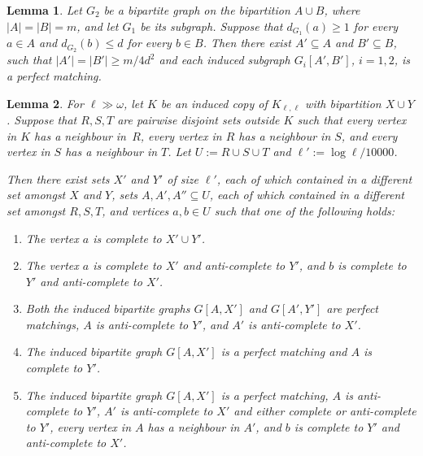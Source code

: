 \documentclass[10pt,a4paper]{amsart}
\theoremstyle{plain}
\newtheorem{lem}{Lemma}
\theoremstyle{definition}
\begin{document}
    \begin{lem} \label{obs:induced-matching}
        Let $G_2$ be a bipartite graph on the bipartition $A\cup B$, where $|A| = |B| = m$, and let $G_1$ be its subgraph. Suppose that $d_{G_1}(a) \ge 1$ for every $a \in A$ and $d_{G_2}(b) \le d$ for every $b \in B$.
        Then there exist $A' \subseteq A$ and $B' \subseteq B$, such that $|A'| = |B'| \ge m/4d^2$ and each induced subgraph $G_i[A', B']$, $i=1,2$, is a perfect matching. 
    \end{lem}%

    \begin{lem}\label{lem:cases}
        For $\ell \gg \omega$, let $K$ be an induced copy of $K_{\ell,\ell}$ with bipartition $X\cup Y$.
        Suppose that $R, S, T$ are pairwise disjoint sets outside $K$ such that every vertex in $K$ has a neighbour in~$R$, every vertex in $R$ has a neighbour in $S$, and every vertex in $S$ has a neighbour in $T$. 
        Let $U:=R\cup S\cup T$ and $\ell' := \log \ell / 10000$.
        
        
        Then there exist sets $X'$ and $Y'$ of size $\ell'$, each of which contained in a different set amongst $X$ and $Y$, sets $A, A', A'' \subseteq U$, each of which contained in a different set amongst $R, S, T$, and vertices $a, b \in U$ such that one of the following holds:
        \begin{enumerate} [label = (K\arabic*)]
            \item \label{itm:a}
                The vertex $a$ is complete to $X' \cup Y'$.
            \item \label{itm:b}
                The vertex $a$ is complete to $X'$ and anti-complete to $Y'$, and $b$ is complete to $Y'$ and anti-complete to $X'$. 
            \item \label{itm:c}
                Both the induced bipartite graphs $G[A, X']$ and $G[A', Y']$ are perfect matchings, $A$ is anti-complete to $Y'$, and $A'$ is anti-complete to $X'$.
                
            \item \label{itm:d}
                The induced bipartite graph $G[A, X']$ is a perfect matching and $A$ is complete to $Y'$.
            \item \label{itm:e}
                The induced bipartite graph $G[A, X']$ is a perfect matching, $A$ is anti-complete to $Y'$, $A'$ is anti-complete to $X'$ and either complete or anti-complete to $Y'$, every vertex in $A$ has a neighbour in $A'$, and $b$ is complete to $Y'$ and anti-complete to $X'$.
                

\end{enumerate}
\end{lem}
\end{document}
